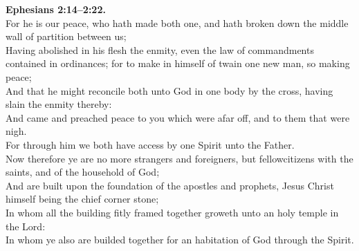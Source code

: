 \documentclass[10pt]{article} %
\begin{document}
{\begin{minipage}[t]{0.45\textwidth}
\textbf{Ephesians 2:14--2:22.}\\
For he is our peace, who hath made both one, and hath broken down the middle wall of partition between us;\\
Having abolished in his flesh the enmity, even the law of commandments contained in ordinances; for to make in himself of twain one new man, so making peace;\\
And that he might reconcile both unto God in one body by the cross, having slain the enmity thereby:\\
And came and preached peace to you which were afar off, and to them that were nigh.\\
For through him we both have access by one Spirit unto the Father.\\
Now therefore ye are no more strangers and foreigners, but fellowcitizens with the saints, and of the household of God;\\
And are built upon the foundation of the apostles and prophets, Jesus Christ himself being the chief corner stone;\\
In whom all the building fitly framed together groweth unto an holy temple in the Lord:\\
In whom ye also are builded together for an habitation of God through the Spirit.\\

\end{minipage}}
\vspace*{\fill}
\newpage
\Huge%
\vspace*{\fill}
\begin{spacing}{1.3}%
\end{spacing}
\vspace*{\fill}
\end{document}
